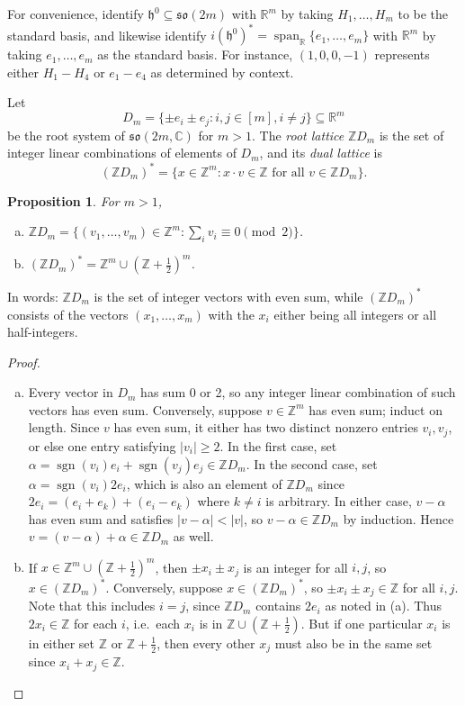 \documentclass[reqno]{amsart}
\newtheorem{proposition}[theorem]{Proposition}
\theoremstyle{definition} \newtheorem{example}[theorem]{Example}
\newcommand{\CC}{\mathbb{C}}
\newcommand{\RR}{\mathbb{R}}
\newcommand{\ZZ}{\mathbb{Z}}
\newcommand{\so}{\mathfrak{so}}
\newcommand{\sgn}{\operatorname{sgn}}
\newcommand{\vspan}{\operatorname{span}}
\newcommand{\h}{\mathfrak{h}}
\begin{document}
For convenience, identify $\h^0 \subseteq \so(2m)$ with $\RR^m$ by taking $H_1, \ldots, H_m$ to be the standard basis, and likewise identify $i(\h^0)^* = \vspan_{\RR} \{e_1,\ldots,e_m\}$ with $\RR^m$ by taking $e_1, \ldots, e_m$ as the standard basis. For instance, $(1,0,0,-1)$ represents either $H_1-H_4$ or $e_1-e_4$ as determined by context.


Let
\begin{equation*}
D_m = \{\pm e_i \pm e_j : i,j \in [m], i \neq j\} \subseteq \RR^m
\end{equation*}
be the root system of $\so(2m,\CC)$ for $m > 1$. The \emph{root lattice} $\ZZ D_m$ is the set of integer linear combinations of elements of $D_m$, and its \emph{dual lattice} is
\begin{equation*}
(\ZZ D_m)^* = \{x \in \ZZ^m : x \cdot v \in \ZZ \text{ for all $v \in \ZZ D_m$} \}.
\end{equation*}

\begin{proposition} \label{prop:dual-ZD} For $m > 1$,
\begin{enumerate}[(a)]
\item $\ZZ D_m = \{(v_1, \ldots, v_m) \in \ZZ^m : \sum_i v_i \equiv 0 \pmod{2}\}$.
\item $(\ZZ D_m)^* = \ZZ^m \cup (\ZZ+\tfrac{1}{2})^m$.
\end{enumerate}
\end{proposition}
In words: $\ZZ D_m$ is the set of integer vectors with even sum, while $(\ZZ D_m)^*$ consists of the vectors $(x_1, \ldots, x_m)$ with the $x_i$ either being all integers or all half-integers.
\begin{proof} \hfill
\begin{enumerate}[(a)]
\item Every vector in $D_m$ has sum 0 or 2, so any integer linear combination of such vectors has even sum. Conversely, suppose $v \in \ZZ^m$ has even sum; induct on length. Since $v$ has even sum, it either has two distinct nonzero entries $v_i, v_j$, or else one entry satisfying $|v_i| \geq 2$. In the first case, set $\alpha = \sgn(v_i)e_i + \sgn(v_j)e_j \in \ZZ D_m$. In the second case, set $\alpha = \sgn(v_i)2e_i$, which is also an element of $\ZZ D_m$ since $2e_i = (e_i+e_k)+(e_i-e_k)$ where $k \neq i$ is arbitrary. In either case, $v-\alpha$ has even sum and satisfies $|v-\alpha| < |v|$, so $v-\alpha \in \ZZ D_m$ by induction. Hence $v = (v-\alpha) + \alpha \in \ZZ D_m$ as well.

\item If $x \in \ZZ^m \cup (\ZZ+\tfrac{1}{2})^m$, then $\pm x_i \pm x_j$ is an integer for all $i,j$, so $x \in (\ZZ D_m)^*$. Conversely,  suppose $x \in (\ZZ D_m)^*$, so $\pm x_i \pm x_j \in \ZZ$ for all $i,j$.  Note that this includes $i = j$, since $\ZZ D_m$ contains $2e_i$ as noted in (a). Thus $2x_i \in \ZZ$ for each $i$, i.e.\ each $x_i$ is in $\ZZ \cup (\ZZ+\tfrac{1}{2})$.  But if one particular $x_i$ is in either set $\ZZ$ or $\ZZ+\tfrac{1}{2}$, then every other $x_j$ must also be in the same set since $x_i + x_j \in \ZZ$.
\end{enumerate}
\end{proof}
\end{document}
